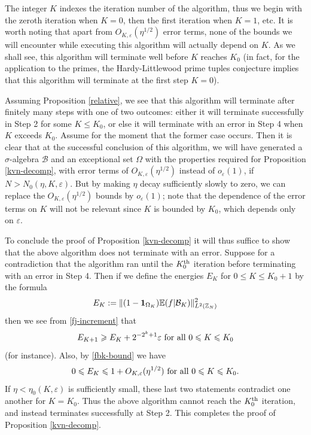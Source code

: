 \documentclass[12pt,a4paper,reqno]{amsart}
\numberwithin{equation}{section}
\theoremstyle{plain}
\theoremstyle{definition}
\renewcommand{\leq}{\leqslant}
\renewcommand{\geq}{\geqslant}
\def\B{{\mathcal B}}
\def\Z{{\mathbb Z}}
\def\E{{\mathbb E}}
\def\eps{{\varepsilon}}
\def\vs{\vspace{11pt}}
\def\ni{\noindent}
\def\endproof{\hfill{\usebox{\proofbox}}}
\def\emph#1{{\it #1}}
\begin{document}
\ni \emph{Remarks.} The integer $K$ indexes the iteration number of the algorithm, thus we begin with the zeroth iteration when $K=0$, then the first
iteration when $K=1$, etc.  It is worth noting that apart from $O_{K,\eps}(\eta^{1/2})$ error terms, none of the 
bounds we will encounter while executing this algorithm will actually depend on $K$.  As we shall see, this algorithm will terminate well before $K$
reaches $K_0$ (in fact, for the application to the primes, the Hardy-Littlewood prime tuples conjecture implies that this algorithm will terminate at the first step $K=0$).
\vs

\ni Assuming Proposition \ref{relative}, we see that this algorithm will terminate after finitely many steps with one of two outcomes: either 
it will terminate successfully in Step 2 for some $K \leq K_0$, or else it will terminate with an error in Step 4 when $K$ 
exceeds $K_0$.  Assume for the moment that the former case occurs.  Then it is clear that at the successful conclusion of this algorithm,
we will have generated a $\sigma$-algebra $\B$ and an exceptional set $\Omega$ with the properties required for 
Proposition \ref{kvn-decomp}, with
error terms of $O_{K,\eps}(\eta^{1/2})$ instead of $o_\eps(1)$, if $N > N_0(\eta, K, \eps)$.
But by making $\eta$ decay sufficiently slowly to zero, we can replace the $O_{K,\eps}(\eta^{1/2})$ bounds by $o_\eps(1)$; note that 
the dependence of the error terms on $K$ will not be relevant since $K$ is bounded by $K_0$, which depends only on $\eps$.
\vs

\ni To conclude the proof of Proposition \ref{kvn-decomp} it will thus suffice to show that the above algorithm does not
terminate with an error.  Suppose for a contradiction that the algorithm ran until the $K_0^{\mbox{\scriptsize th}}$ iteration before terminating with an error in Step 4.
Then if we define the energies $E_K$ for $0 \leq K \leq K_0+1$ by the formula
$$ E_K := \| (1 - {\bf 1}_{\Omega_K}) \E(f|\B_K) \|_{L^2(\Z_N)}^2$$
then we see from \eqref{fj-increment} that
\begin{equation}\label{energy-increment}
E_{K+1} \geq E_K + 2^{-2^k + 1} \eps \hbox{ for all } 0 \leq K \leq K_0
\end{equation}
(for instance).  Also, by \eqref{fbk-bound} we have
$$ 0 \leq E_K \leq 1 + O_{K,\eps}(\eta^{1/2}) \hbox{ for all } 0 \leq K \leq K_0.$$
If $\eta < \eta_0(K,\eps)$ is sufficiently small, these last two statements contradict one another for $K = K_0$. Thus the above algorithm cannot reach the $K_0^{\mbox{\scriptsize th}}$ iteration, and instead terminates
successfully at Step 2.  This completes the proof of Proposition \ref{kvn-decomp}.\endproof\vs
\end{document}
